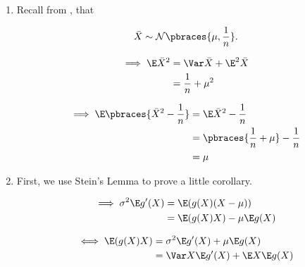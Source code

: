 \begin{solution}

\begin{enumerate}[label = (\alph*)]

    \item Recall from \cite[lecture 4, slide 27]{EStat}, that

    \begin{align*}
        \bar X
        \sim
        \mathcal N \pbraces{\mu, \frac{1}{n}}.
    \end{align*}
    
    
    \begin{align*}
        \implies
        \E \bar X^2
        & =
        \Var \bar X + \E^2 \bar X \\
        & =
        \frac{1}{n} + \mu^2
    \end{align*}
    
    \begin{align*}
        \implies
        \E \pbraces{\bar X^2 - \frac{1}{n}}
        & =
        \E \bar X^2 - \frac{1}{n} \\
        & =
        \pbraces{\frac{1}{n} + \mu} - \frac{1}{n} \\
        & =
        \mu
    \end{align*}

    \item First, we use Stein's Lemma to prove a little corollary.
    
    \begin{align*}
        \implies
        \sigma^2 \E g^\prime(X)
        & =
        \E (g(X) (X - \mu)) \\
        & =
        \E (g(X) X) - \mu \E g(X)
    \end{align*}

    \begin{align*}
        \iff
        \E(g(X) X)
        & =
        \sigma^2 \E g^\prime(X) + \mu \E g(X) \\
        & =
        \Var X \E g^\prime(X) + \E X \E g(X)
    \end{align*}


\end{enumerate}
\end{solution}
